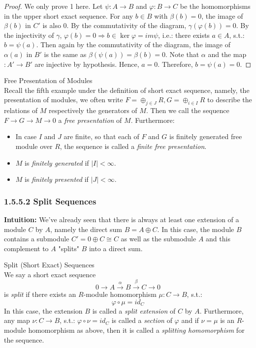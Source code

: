 \begin{proof}
    We only prove 1 here. Let $\psi: A\to B$ and $\varphi: B\to C$ be the homomorphisms in the upper short exact sequence. For any $b\in B$ with $\beta(b) =0$, the image of $\beta (b)$ in $C'$ is also $0$. By the commutativity of the diagram, $\gamma (\varphi(b)) =0$. By the injectivity of $\gamma$, $\varphi(b) =0 \Rightarrow b\in \ker \varphi= im \psi$, i.e.: there exists $a \in A$, s.t.: $b=\psi (a)$. Then again by the commutativity of the diagram, the image of $\alpha (a)$ in $B'$ is the same as $\beta (\psi (a)) = \beta(b) =0$. Note that $\alpha$ and the map$:A' \to B'$ are injective by hypothesis. Hence, $a=0$. Therefore, $b= \psi(a)=0$.
\end{proof}


\begin{definition}{Free Presentation of Modules}\\
Recall the fifth example under the definition of short exact sequence, namely, the presentation of modules, we often write $F= \oplus_{j \in J} R, G=\oplus_{i \in I} R$ to describe the relations of $M$ respectively the generators of $M$. Then we call the sequence $F \to G \to M \to 0$ a \textit{free presentation} of $M$. Furthermore:
\begin{itemize}
    \item In case $I$ and $J$ are finite, so that each of $F$ and $G$ is finitely generated free module over $R$, the sequence is called a \textit{finite free presentation}.

    \item $M$ is \textit{finitely generated} if $|I| <\infty$.
    \item $M$ is \textit{finitely presented} if $|J|< \infty$.
\end{itemize}
\end{definition}

\subsubsection{1.5.5.2 Split Sequences}

\noindent\textbf{Intuition:} We've already seen that there is always at least one extension of a module $C$ by $A$, namely the direct sum $B=A \oplus C$. In this case, the module $B$ contains a submodule $C'= 0 \oplus C \cong C$ as well as the submodule $A$ and this complement to $A$ "splits" $B$ into a direct sum.

\begin{definition}{Split (Short Exact) Sequences}\\
We say a short exact sequence
$$0 \to A \overset{\alpha}{\to} B \overset{\beta}{\to} C \to 0$$
is \textit{split} if there exists an $R$-module homomorphism $\mu: C \to B$, s.t.:
$$\varphi \circ \mu= id_C$$
In this case, the extension $B$ is called a \textit{split extension} of $C$ by $A$. Furthermore, any map $\nu:C \to B$, s.t.: $\varphi \circ \nu=id_C$ is called a \textit{section} of $\varphi$ and if $\nu=\mu$ is an $R$-module homomorphism as above, then it is called a \textit{splitting homomorphism} for the sequence.
\end{definition}

